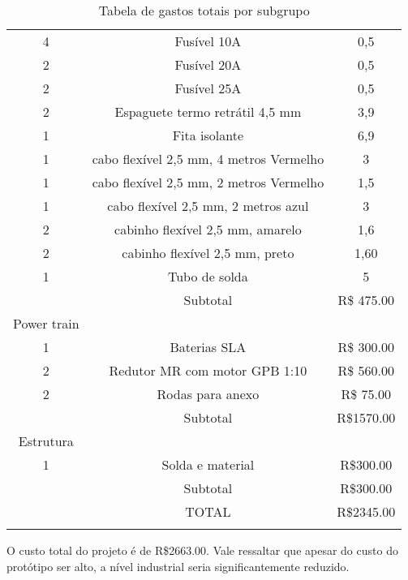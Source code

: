 \begin{longtable}{|c|c|c|}
4 & Fusível 10A & 0,5 \\
2 & Fusível 20A & 0,5 \\
2 & Fusível 25A & 0,5 \\
2 & Espaguete termo retrátil 4,5 mm & 3,9 \\
1 & Fita isolante & 6,9 \\
1 & cabo flexível 2,5 mm, 4 metros Vermelho & 3 \\
1 & cabo flexível 2,5 mm, 2 metros Vermelho & 1,5 \\
1 & cabo flexível 2,5 mm, 2 metros azul & 3 \\
2 & cabinho flexível 2,5 mm, amarelo & 1,6 \\
2 & cabinho flexível 2,5 mm, preto & 1,60 \\
1 & Tubo de solda & 5 \\
 & Subtotal & R\$ 475.00 \\ \hline
Power train &  &  \\
1 & Baterias SLA & R\$ 300.00 \\
2 & Redutor MR com motor GPB 1:10 & R\$ 560.00 \\
2 & Rodas para anexo & R\$ 75.00 \\
 & Subtotal & R\$1570.00 \\ \hline
Estrutura &  &  \\
1 & Solda e material & R\$300.00 \\
 & Subtotal & R\$300.00 \\ \hline
 & TOTAL & R\$2345.00 \\ \hline
\caption{Tabela de gastos totais por subgrupo}
\label{tab:custos_tabela}
\end{longtable}

O custo total do projeto é de R\$2663.00.  Vale ressaltar que apesar do custo do protótipo ser alto, a nível industrial seria significantemente reduzido.
